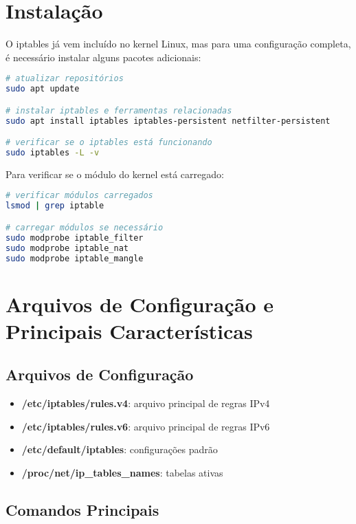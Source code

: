 ﻿\documentclass[12pt,fleqn]{article}
\begin{document}
\section{Instalação}

O iptables já vem incluído no kernel Linux, mas para uma configuração completa, é necessário instalar alguns pacotes adicionais:

\begin{lstlisting}[language=bash, caption=Instalação do iptables]
# atualizar repositórios
sudo apt update

# instalar iptables e ferramentas relacionadas
sudo apt install iptables iptables-persistent netfilter-persistent

# verificar se o iptables está funcionando
sudo iptables -L -v
\end{lstlisting}

Para verificar se o módulo do kernel está carregado:

\begin{lstlisting}[language=bash, caption=Verificação de módulos]
# verificar módulos carregados
lsmod | grep iptable

# carregar módulos se necessário
sudo modprobe iptable_filter
sudo modprobe iptable_nat
sudo modprobe iptable_mangle
\end{lstlisting}

\section{Arquivos de Configuração e Principais Características}

\subsection{Arquivos de Configuração}

\begin{itemize}
    \item \textbf{/etc/iptables/rules.v4}: arquivo principal de regras IPv4
    \item \textbf{/etc/iptables/rules.v6}: arquivo principal de regras IPv6
    \item \textbf{/etc/default/iptables}: configurações padrão
    \item \textbf{/proc/net/ip\_tables\_names}: tabelas ativas
\end{itemize}

\subsection{Comandos Principais}
\end{document}
